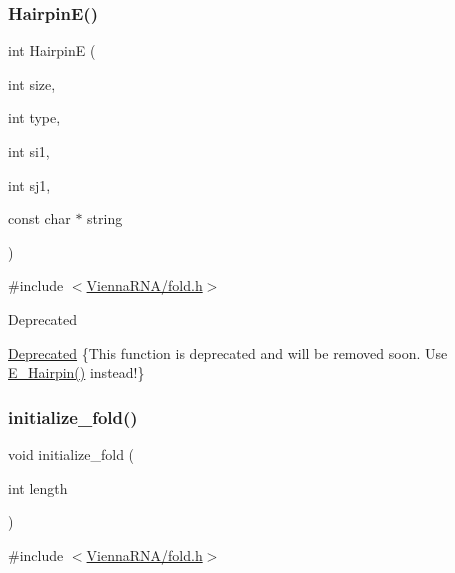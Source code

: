 \subsubsection{\texorpdfstring{Hairpin\+E()}{HairpinE()}}
{\footnotesize\ttfamily int HairpinE (\begin{DoxyParamCaption}\item[{int}]{size,  }\item[{int}]{type,  }\item[{int}]{si1,  }\item[{int}]{sj1,  }\item[{const char $\ast$}]{string }\end{DoxyParamCaption})}



{\ttfamily \#include $<$\hyperlink{fold_8h}{Vienna\+R\+N\+A/fold.\+h}$>$}

\begin{DoxyRefDesc}{Deprecated}
\item[\hyperlink{deprecated__deprecated000077}{Deprecated}]\{This function is deprecated and will be removed soon. Use \hyperlink{group__eval__loops__hp_gadf943ee9a45b7f4cee9192c06210dace}{E\+\_\+\+Hairpin()} instead!\} \end{DoxyRefDesc}
\mbox{\label{group__mfe__global__deprecated_gac3f0a28d9cb609d388b155445073fd20}} 
\subsubsection{\texorpdfstring{initialize\+\_\+fold()}{initialize\_fold()}}
{\footnotesize\ttfamily void initialize\+\_\+fold (\begin{DoxyParamCaption}\item[{int}]{length }\end{DoxyParamCaption})}



{\ttfamily \#include $<$\hyperlink{fold_8h}{Vienna\+R\+N\+A/fold.\+h}$>$}

